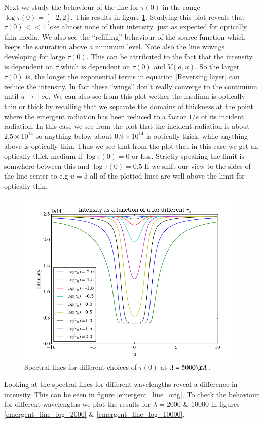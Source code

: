\documentclass{aa}   %
\begin{document}
Next we study the behaviour of the line for $\tau(0)$ in the range $\log \tau(0) = [-2, 2]$.
This results in figure \ref{emergent_line_log_5000}. Studying this plot reveals that $\tau(0)<<1$ lose almost none of their intensity, just as expected for optically thin media. We also see the ``refilling'' behaviour of the source function which keeps the saturation above a minimum level. Note also the line wiwngs developing for large $\tau(0)$. This can be attributed to the fact that the intensity is dependent on $\tau$ which is dependent on $\tau(0)$ and $V(a,u)$. So the larger $\tau(0)$ is, the longer the exponential terms in equation \ref{Reversing layer} can reduce the intensity. In fact these ``wings'' don't really converge to the continuum until $u \rightarrow \pm \infty$. We can also see from this plot wether the medium is optically thin or thick by recalling that we separate the domains of thickness at the point where the emergent radiation has been reduced to a factor $1/e$ of its incident radiation. In this case we see from the plot that the incident radiation is about $2.5\times 10^14$ so anything below about $0.9\times 10^14$ is optically thick, while anything above is optically thin.
Thus we see that from the plot that in this case we get an optically thick medium if $\log \tau(0)= 0$ or less. Strictly
speaking the limit is somwhere between this and $\log \tau(0) = 0.5$ If we shift our view to the sides of the line center to e.g $ u = 5$ all of the plotted lines are well above the limit for optically thin.
\begin{figure}
 \includegraphics[width=.49\textwidth]{emergent_line_log_5000.png}
 \caption{Spectral lines for different choices of $\tau(0)$ at $\lambda = 5000 \AA$.}
 \label{emergent_line_log_5000} 
\end{figure}

Looking at the spectral lines for different wavelengths reveal a difference in intensity. This can be seen in figure \ref{emergent_line_orig}.
To check the behaviour for different wavelengths we plot the results for $\lambda = 2000$ \& $10000$ in figures  \ref{emergent_line_log_2000} $\&$ \ref{emergent_line_log_10000}.
\end{document}
